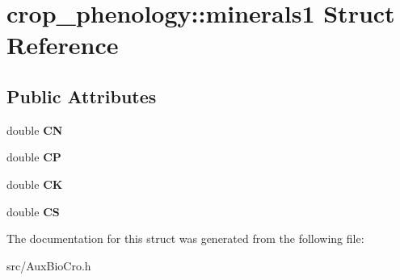 \hypertarget{structcrop__phenology_1_1minerals1}{\section{crop\-\_\-phenology\-:\-:minerals1 Struct Reference}
\label{structcrop__phenology_1_1minerals1}
}
\subsection*{Public Attributes}
\begin{DoxyCompactItemize}
\item 
\hypertarget{structcrop__phenology_1_1minerals1_abfe34612e281f2379bcd96cb1d8bf45a}{double {\bfseries C\-N}}\label{structcrop__phenology_1_1minerals1_abfe34612e281f2379bcd96cb1d8bf45a}

\item 
\hypertarget{structcrop__phenology_1_1minerals1_a93c7091c58b725e1e1dede8758a91e17}{double {\bfseries C\-P}}\label{structcrop__phenology_1_1minerals1_a93c7091c58b725e1e1dede8758a91e17}

\item 
\hypertarget{structcrop__phenology_1_1minerals1_adf0ca64d51363e052e7a8b446b878c68}{double {\bfseries C\-K}}\label{structcrop__phenology_1_1minerals1_adf0ca64d51363e052e7a8b446b878c68}

\item 
\hypertarget{structcrop__phenology_1_1minerals1_ae5893390268db8712f707401364e1cba}{double {\bfseries C\-S}}\label{structcrop__phenology_1_1minerals1_ae5893390268db8712f707401364e1cba}

\end{DoxyCompactItemize}


The documentation for this struct was generated from the following file\-:\begin{DoxyCompactItemize}
\item 
src/Aux\-Bio\-Cro.\-h\end{DoxyCompactItemize}

